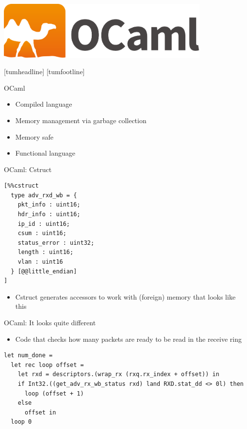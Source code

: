 \documentclass[NET,english,aspectratio=169,notitleframe]{tumbeamer}
\begin{document}
\begin{frame}{}
\centering\includegraphics[width=0.8\textwidth]{pics/ocaml}
\end{frame}
[tumheadline]
[tumfootline]

\begin{frame}{OCaml}
\begin{itemize}
\item Compiled language
\item Memory management via garbage collection
\item Memory safe
\item Functional language
\end{itemize}
\end{frame}


\begin{frame}[fragile]{OCaml: Cstruct}
\begin{verbatim}
[%%cstruct
  type adv_rxd_wb = {
    pkt_info : uint16;
    hdr_info : uint16;
    ip_id : uint16;
    csum : uint16;
    status_error : uint32;
    length : uint16;
    vlan : uint16
  } [@@little_endian]
]
\end{verbatim}
\begin{itemize}
\item Cstruct generates accessors to work with (foreign) memory that looks like this
\end{itemize}
\end{frame}

\begin{frame}[fragile]{OCaml: It looks quite different}
\begin{itemize}
\item Code that checks how many packets are ready to be read in the receive ring
\end{itemize}
\begin{verbatim}
let num_done =
  let rec loop offset =
    let rxd = descriptors.(wrap_rx (rxq.rx_index + offset)) in
    if Int32.((get_adv_rx_wb_status rxd) land RXD.stat_dd <> 0l) then
      loop (offset + 1)
    else
      offset in
  loop 0
\end{verbatim}
\end{frame}
\end{document}
